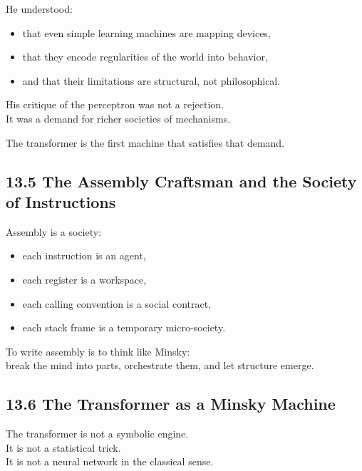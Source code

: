 He understood:

\begin{itemize}
\tightlist
\item
  that even simple learning machines are mapping devices,
\item
  that they encode regularities of the world into behavior,
\item
  and that their limitations are structural, not philosophical.
\end{itemize}

His critique of the perceptron was not a rejection.\\
It was a demand for richer societies of mechanisms.

The transformer is the first machine that satisfies that demand.

\hypertarget{the-assembly-craftsman-and-the-society-of-instructions}{%
\subsection{13.5 The Assembly Craftsman and the Society of
Instructions}\label{the-assembly-craftsman-and-the-society-of-instructions}}

Assembly is a society:

\begin{itemize}
\tightlist
\item
  each instruction is an agent,
\item
  each register is a workspace,
\item
  each calling convention is a social contract,
\item
  each stack frame is a temporary micro-society.
\end{itemize}

To write assembly is to think like Minsky:\\
break the mind into parts, orchestrate them, and let structure emerge.

\hypertarget{the-transformer-as-a-minsky-machine}{%
\subsection{13.6 The Transformer as a Minsky
Machine}\label{the-transformer-as-a-minsky-machine}}

The transformer is not a symbolic engine.\\
It is not a statistical trick.\\
It is not a neural network in the classical sense.

